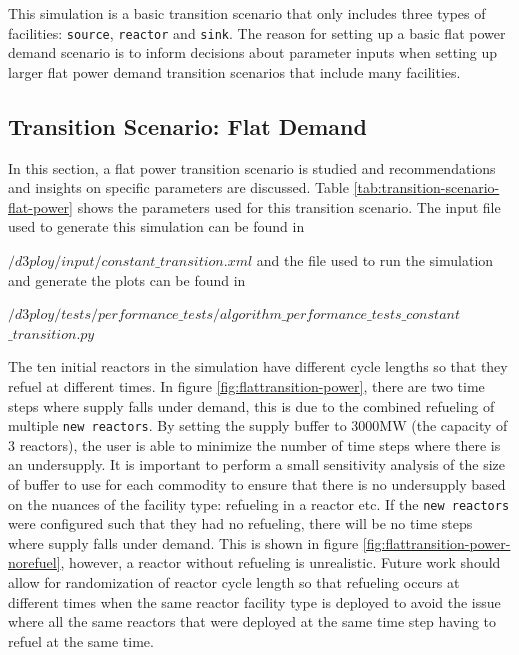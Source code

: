 \documentclass[11pt,letterpaper]{article}
\begin{document}
This simulation is a basic transition scenario that only includes three 
types of facilities: \texttt{source}, \texttt{reactor} and \texttt{sink}.
The reason for setting up a basic flat power demand scenario is to 
inform decisions about parameter inputs when setting up larger flat power 
demand transition scenarios that include many facilities. 

\subsection{Transition Scenario: Flat Demand}
In this section, a flat power transition scenario is studied and 
recommendations and insights on specific parameters are 
discussed. 
Table \ref{tab:transition-scenario-flat-power} shows the parameters 
used for this transition scenario. 
The input file used to generate this simulation can be found in

\noindent
$/d3ploy/input/constant\_transition.xml$ and the file used 
to run the simulation and generate the plots can be found in 

\noindent
$/d3ploy/tests/performance\_tests/algorithm\_performance\_tests\_constant$
\linebreak
$\_transition.py$

The ten initial reactors in the simulation have different cycle 
lengths so that they refuel at different times. 
In figure \ref{fig:flattransition-power}, there are two time steps
where supply falls under demand, this is due to the combined 
refueling of multiple \texttt{new reactors}. 
By setting the supply buffer to 3000MW (the capacity of 3 reactors), 
the user is able to minimize the number of time steps where there 
is an undersupply. 
It is important to perform a small sensitivity analysis of the size 
of buffer to use for each commodity to ensure that there is no 
undersupply based on the nuances of the facility type: 
refueling in a reactor etc. 
If the \texttt{new reactors} were configured such that they had 
no refueling, there will be no time steps where supply falls under 
demand.
This is shown in figure \ref{fig:flattransition-power-norefuel}, 
however, a reactor without refueling is unrealistic. 
Future work should allow for randomization of reactor cycle length 
so that refueling occurs at different times when the same reactor 
facility type is deployed to avoid the issue where all the same 
reactors that were deployed at the same time step having to refuel 
at the same time. 
\end{document}
